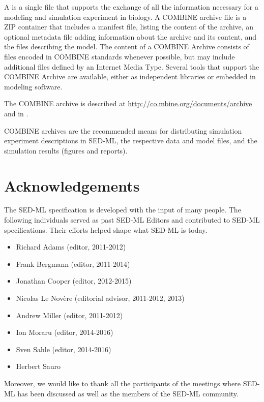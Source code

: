 \documentclass[pdftex,rgb,dvipsnames,svgnames,hyperref,table]{report}
\begin{document}
A  \citep{Bergmann2014} is a single file that supports the exchange of all the information necessary for a modeling and simulation experiment in biology. A COMBINE archive file is a ZIP container that includes a manifest file, listing the content of the archive, an optional metadata file adding information about the archive and its content, and the files describing the model. The content of a COMBINE Archive consists of files encoded in COMBINE standards whenever possible, but may include additional files defined by an Internet Media Type. Several tools that support the COMBINE Archive are available, either as independent libraries or embedded in modeling software.

The COMBINE archive is described at \url{http://co.mbine.org/documents/archive} and 
in \citep{Bergmann2014}.

COMBINE archives are the recommended means for distributing simulation experiment descriptions in SED-ML, the respective data and model files, and the simulation results (figures and reports).

\chapter{Acknowledgements}
\label{sec:acknowledgments}
The SED-ML specification is developed with the input of many people. The following individuals served as past SED-ML Editors and contributed to SED-ML specifications. Their efforts helped shape what SED-ML is today.

\begin{itemize}
\item Richard Adams (editor, 2011-2012)
\item Frank Bergmann (editor, 2011-2014)
\item Jonathan Cooper (editor, 2012-2015)
\item Nicolas Le Novère (editorial advisor, 2011-2012, 2013)
\item Andrew Miller (editor, 2011-2012)
\item Ion Moraru (editor, 2014-2016)
\item Sven Sahle (editor, 2014-2016)
\item Herbert Sauro
\end{itemize}

Moreover, we would like to thank all the participants of the meetings where SED-ML has been discussed as well as the members of the SED-ML community.
\end{document}
